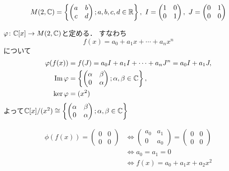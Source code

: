 \documentclass[dvipdfmx, leqno]{jsreport}
\begin{document}
\begin{souexample}
\begin{equation*}
    M(2, \mathbb{C})= \begin{Bmatrix}\begin{pmatrix}a& b\\ c& d\end{pmatrix}; a, b, c, d\in \mathbb{R}\end{Bmatrix},\ I= \begin{pmatrix}1& 0\\ 0& 1\end{pmatrix},\ J= \begin{pmatrix}0& 1\\ 0& 0\end{pmatrix}
\end{equation*}

\begin{center}
\end{center}

    $\varphi\colon \mathbb{C}[x]\to M(2, \mathbb{C})$と定める．
    すなわち
\begin{equation*}
    f(x)= a_0+ a_1x+ \cdots+ a_nx^n
\end{equation*}
    について
\begin{align*}
    \varphi(f(x))
    &= f(J)
    = a_0I+ a_1I+ \cdots+ a_nJ^n
    = a_0I+ a_1J,\\
    \operatorname{Im}{\varphi}
    &= \begin{Bmatrix}\begin{pmatrix}\alpha& \beta\\ 0& \alpha\end{pmatrix}; \alpha, \beta\in \mathbb{C}\end{Bmatrix},\\
    \ker{\varphi}&= (x^2)
\end{align*}
    よって$\mathbb{C}[x]/(x^2)\cong \begin{Bmatrix}\begin{pmatrix}\alpha& \beta\\ 0& \alpha\end{pmatrix}; \alpha, \beta\in \mathbb{C}\end{Bmatrix}$
\end{souexample}
\begin{align*}
    \phi(f(x))= \begin{pmatrix}0& 0\\ 0& 0\end{pmatrix}
    &\iff \begin{pmatrix}a_0& a_1\\ 0& a_0\end{pmatrix}= \begin{pmatrix}0& 0\\ 0& 0\end{pmatrix}\\
    &\iff a_0= a_1= 0\\
    &\iff f(x)= a_0+ a_1x+ a_2x^2
\end{align*}
\end{document}
